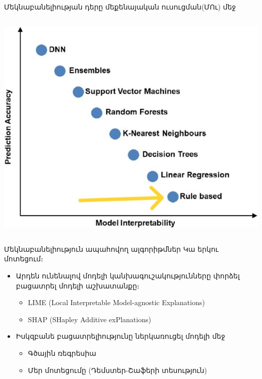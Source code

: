 \documentclass[aspectratio=169]{beamer}
\begin{document}
\begin{frame}{Մեկնաբանելիության դերը մեքենայական ուսուցման(ՄՈւ) մեջ}
\begin{columns}
\begin{column}{0.5\textwidth}
\begin{overprint}
        \includegraphics[width=\textwidth]{"interp_over_power_accent.jpg"}
    \end{overprint}
\end{column}  
\end{columns}
\end{frame}

\begin{frame}{Մեկնաբանելիություն ապահովող ալգորիթմներ}
Կա երկու մոտեցում։
\begin{itemize}
    \item Արդեն ունենալով մոդելի կանխագուշակությունները փորձել բացատրել մոդելի աշխատանքը։ \pause
        \begin{itemize}
            \item \rm{LIME} (Local Interpretable Model-agnostic Explanations)
            \item SHAP (SHapley Additive exPlanations)
        \end{itemize}
    \pause
    \item Իսկզբանե բացատրելիությունը ներկառուցել մոդելի մեջ 
    \begin{itemize}
        \item Գծային ռեգրեսիա
        \item Մեր մոտեցումը (Դեմստեր-Շաֆերի տեսություն)
    \end{itemize}
\end{itemize}
\end{frame}
\end{document}
